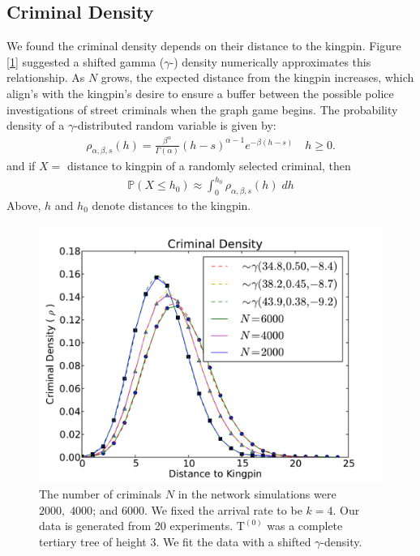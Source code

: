 \documentclass[%
 reprint,
 amsmath,amssymb,
 aps,
]{revtex4-1}
\renewcommand{\t }[1]{\mathrm{#1}}
\newcommand{\bb}[1]{\mathbb{#1}}
\theoremstyle{plain}
\theoremstyle{definition}
\begin{document}
\subsection*{Criminal Density}

We found the criminal density depends on their distance to the kingpin.  Figure [\ref{nd}] suggested a shifted gamma ($\gamma$-) density numerically approximates this relationship.  As $N$ grows, the expected distance from the kingpin increases, which align's with the kingpin's desire to ensure a buffer between the possible police investigations of street criminals when the graph game begins.  The probability density of a $\gamma$-distributed random variable is given by:
\begin{align}
\rho_{\alpha, \beta, s}(h) = \frac{\beta^\alpha}{\Gamma(\alpha)}(h - s)^{\alpha-1}e^{ -\beta (h-s)}\quad h \geq 0.
\end{align}
and if $X=$ distance to kingpin of a randomly selected criminal, then
\begin{align}
\bb P(X \leq h_0) \approx \int_{0}^{h_0}\rho_{\alpha, \beta, s}(h) \; dh
\end{align}
Above, $h$ and $h_0$ denote distances to the kingpin.

\begin{figure}
\centering
\includegraphics[width=\linewidth]{nodedensity.pdf}
\caption{The number of criminals $N$ in the network simulations were $2000, \; 4000$; and $6000$.  We fixed the arrival rate to be $k = 4$.  Our data is generated from 20 experiments.  $\t T^{(0)}$ was a complete tertiary tree of height 3.  We fit the data with a shifted $\gamma$-density.}
\label{nd}
\end{figure}
\end{document}
